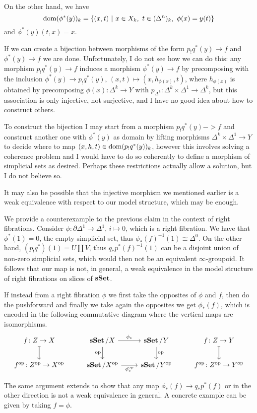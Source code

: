 \documentclass[a4paper,fontsize=12pt]{scrartcl}
\begin{document}
On the other hand, we have
\[\dom(\phi^*(y))_k=\{(x,t)\ |\ x\in X_k,\ t\in(\Delta^n)_k,\ \phi(x)=y(t)\}\]
and $\phi^*(y)(t,x)=x$.

If we can create a bijection between morphisms of the form $p_!q^*(y)\rightarrow
f$ and $\phi^*(y)\rightarrow f$ we are done. Unfortunately, I do not see how we
can do this: any morphism $p_!q^*(y)\rightarrow f$ induces a
morphism $\phi^*(y)\rightarrow f$ by precomposing with the inclusion
$\phi^*(y)\rightarrow p_!q^*(y)$, $(x,t)\mapsto(x,h_{\phi(x)},t)$, where
$h_{\phi(x)}$ is obtained by precomposing $\phi(x)\colon\Delta^k\rightarrow Y$
with $p_{\Delta^k}\colon\Delta^k\times\Delta^1\rightarrow\Delta^k$, but this
association is only injective, not surjective, and I have no good idea about how
to construct others.

To construct the bijection I may start from a morphism $p_!q^*(y)->f$ and
construct another one with $\phi^*(y)$ as domain by lifting morphisms
$\Delta^k\times\Delta^1\rightarrow Y$ to decide where to map
$(x,h,t)\in\operatorname{dom}(p_!q^*(y))_k$, however this involves solving a coherence problem
and I would have to do so coherently to define a morphism of simplicial sets as
desired. Perhaps these restrictions actually allow a solution, but I do not
believe so.

It may also be possible that the injective morphism we mentioned earlier is a
weak equivalence with respect to our model structure, which may be enough.

We provide a counterexample to the previous claim in the context of right
fibrations. Consider
$\phi\colon\partial\Delta^1\rightarrow\Delta^1$, $i\mapsto 0$, which is a right
fibration. We have that $\phi^*(1)=0$, the empty simplicial set, thus
$\phi_*(f)^{-1}(1)\cong\Delta^0$. On the other hand, $(p_!q^*)(1)=U\amalg V$,
thus $q_*p^*(f)^{-1}(1)$ can be a disjoint union of non-zero simplicial sets,
which would then not be an equivalent $\infty$-groupoid. It follows that our map
is not, in general, a weak equivalence in the model structure of right
fibrations on slices of $\operatorname{\mathbf{sSet}}$. 

If instead from a right fibration $\phi$ we first take the opposites of $\phi$
and $f$, then do the pushforward and finally we take again the opposites we get
$\phi_*(f)$, which is encoded in the following commutative diagram where the
vertical maps are isomorphisms.
\[\begin{tikzcd}
	{f\colon Z\rightarrow X} & {\sSet/X} & {\sSet/Y} & {f\colon Z\rightarrow Y} \\
	{f^{\op}\colon Z^{\op}\rightarrow X^{\op}} & {\sSet/X^{\op}} & {\sSet/Y^{\op}} & {f^{\op}\colon Z^{\op}\rightarrow Y^{\op}}
	\arrow["\op", from=1-3, to=2-3]
	\arrow["\op"', from=1-2, to=2-2]
	\arrow["{\phi^{\op}_*}"', from=2-2, to=2-3]
	\arrow["{\phi_*}", from=1-2, to=1-3]
	\arrow[maps to, from=1-1, to=2-1]
	\arrow[maps to, from=1-4, to=2-4]
\end{tikzcd}\]

The same argument extends to show that any map $\phi_*(f)\rightarrow q_*p^*(f)$
or in the other direction is not a weak equivalence in general. A concrete
example can be given by taking $f=\phi$.


\printbibliography
\end{document}
